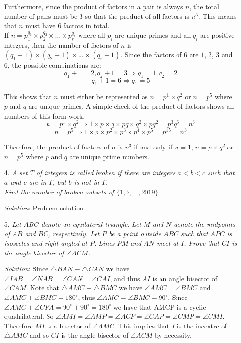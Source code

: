 \documentclass{article}
\begin{document}
\begin{enumerate}[1.]
Furthermore, since the product of factors in a pair is always $n$, the total number of pairs must be $3$ so that the product of all factors is $n^3$. This means that $n$ must have $6$ factors in total.\\

If $n = p_1^{q_1} \times p_2^{q_2} \times \dots \times p_r^{q_r}$ where all $p_i$ are unique primes and all $q_i$ are positive integers, then the number of factors of $n$ is $(q_1 + 1) \times (q_2 + 1) \times \dots \times (q_r + 1)$. Since the factors of $6$ are $1$, $2$, $3$ and $6$, the possible combinations are:
$$q_1 + 1 = 2, q_2 + 1 = 3 \Rightarrow q_1 = 1, q_2 = 2$$
$$q_1 + 1 = 6 \Rightarrow q_1 = 5$$

This shows that $n$ must either be represented as $n = p^1 \times q^2$ or $n = p^5$ where $p$ and $q$ are unique primes. A simple check of the product of factors shows all numbers of this form work.
$$n = p^1 \times q^2 \Rightarrow 1 \times p \times q \times pq \times q^2 \times pq^2 = p^3q^6 = n^3$$
$$n = p^5 \Rightarrow 1 \times p \times p^2 \times p^3 \times p^4 \times p^5 = p^{15} = n^3$$

Therefore, the product of factors of $n$ is $n^3$ if and only if $n = 1$, $n = p \times q^2$ or $n = p^5$ where $p$ and $q$ are unique prime numbers.


\item[4.] %
\textit{A set $T$ of integers is called \textit{broken} if there are integers $a < b < c$ such that $a$ and $c$ are in $T$, but $b$ is not in $T$.\\
Find the number of broken subsets of $\{1, 2, \dots, 2019\}$.}

\textit{Solution}: Problem solution



\item[5.] %
\textit{Let $ABC$ denote an equilateral triangle. Let $M$ and $N$ denote the midpoints of $AB$ and $BC$, respectively.
Let $P$ be a point outside $ABC$ such that $APC$ is isosceles and right-angled at $P$. Lines $PM$ and $AN$ meet at $I$.
Prove that $CI$ is the angle bisector of $\angle ACM$.}

\textit{Solution}: Since $\triangle BAN \equiv \triangle CAN$ we have $\angle IAB = \angle NAB = \angle CAN = \angle CAI $, and thus $AI$ is an angle bisector of $\angle CAM$. Note that $\triangle AMC \equiv \triangle BMC$ we have $\angle AMC = \angle BMC$ and $\angle AMC + \angle BMC =180^\circ$, thus $\angle AMC = \angle BMC = 90^\circ$. Since $\angle AMC + \angle CPA = 90^\circ +90^\circ =180^\circ$ we have that AMCP is a cyclic quadrilateral. So $\angle AMI = \angle AMP = \angle ACP = \angle CAP = \angle CMP = \angle CMI$. Therefore $MI$ is a bisector of $\angle AMC$. This implies that $I$ is the incentre of $\triangle AMC$ and so $CI$ is the angle bisector of $\angle ACM$ by necessity.


\end{enumerate}
\end{document}
